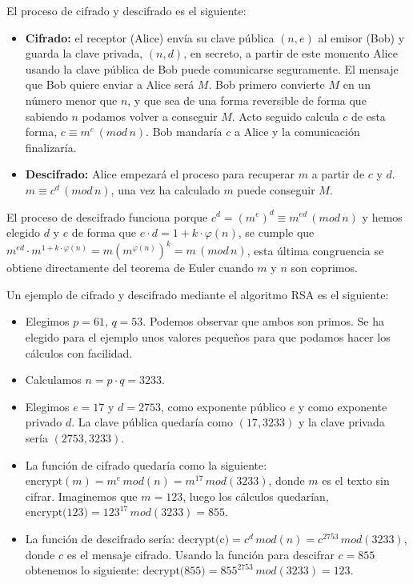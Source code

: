 El proceso de cifrado y descifrado es el siguiente:

\begin{itemize}
	\item \textbf{Cifrado:} el receptor (Alice) envía su clave pública $(n,e)$ al emisor (Bob) y guarda la clave privada, $(n,d)$, en secreto, a partir de este momento Alice usando la clave pública de Bob puede comunicarse seguramente. El mensaje que Bob quiere enviar a Alice será $M$. Bob primero convierte $M$ en un número menor que $n$, y que sea de una forma reversible de forma que sabiendo $n$ podamos volver a conseguir $M$. Acto seguido calcula $c$ de esta forma, $c\equiv m^e\,(mod\,n)$. Bob mandaría $c$ a Alice y la comunicación finalizaría.
	
	\item \textbf{Descifrado:} Alice empezará el proceso para recuperar $m$ a partir de $c$ y $d$. $m\equiv c^d\,(mod\,n)$, una vez ha calculado $m$ puede conseguir $M$.

\end{itemize}

El proceso de descifrado funciona porque $c^d=(m^e)^d\equiv m^{ed}\, (mod\, n)$ y hemos elegido $d$ y $e$ de forma que $e\cdot d =1+k\cdot\varphi(n)$, se cumple que $ m^{ed}\cdot m^{1+k\cdot\varphi(n)} = m(m^{\varphi(n)})^k = m\, (mod\, n)$, esta última congruencia se obtiene directamente del teorema de Euler cuando $m$ y $n$ son coprimos.

Un ejemplo de cifrado y descifrado mediante el algoritmo RSA es el siguiente:

\begin{itemize}

\item Elegimos $p=61$, $q=53$. Podemos observar que ambos son primos. Se ha elegido para el ejemplo unos valores pequeños para que podamos hacer los cálculos con facilidad.

\item Calculamos $n=p\cdot q= 3233$.

\item Elegimos $e=17$ y $d=2753$, como exponente público $e$ y como exponente privado $d$. La clave pública quedaría como $(17, 3233)$ y la clave privada sería $(2753, 3233)$.

\item La función de cifrado quedaría como la siguiente: $\mbox{encrypt}(m) = m^e \,mod(n) = m^{17}\,mod(3233)$, donde $m$ es el texto sin cifrar. Imaginemos que $m=123$, luego los cálculos quedarían, $\mbox{encrypt(123)} = 123^{17}\,mod(3233) = 855$.

\item La función de descifrado sería: $\mbox{decrypt(c)} = c^d\,mod(n) = c^{2753}\,mod(3233)$, donde $c$ es el mensaje cifrado. Usando la función para descifrar $c=855$ obtenemos lo siguiente: $\mbox{decrypt(855)} = 855^{2753}\,mod(3233) = 123$.

\end{itemize}

